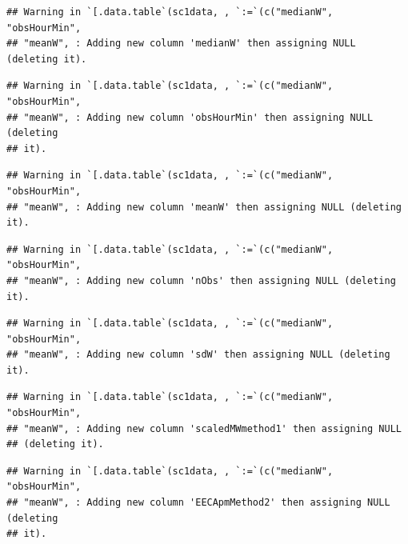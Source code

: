 \documentclass[]{article}
\theoremstyle{definition}
\theoremstyle{definition}
\theoremstyle{definition}
\theoremstyle{remark}
\begin{document}
\begin{verbatim}
## Warning in `[.data.table`(sc1data, , `:=`(c("medianW", "obsHourMin",
## "meanW", : Adding new column 'medianW' then assigning NULL (deleting it).
\end{verbatim}

\begin{verbatim}
## Warning in `[.data.table`(sc1data, , `:=`(c("medianW", "obsHourMin",
## "meanW", : Adding new column 'obsHourMin' then assigning NULL (deleting
## it).
\end{verbatim}

\begin{verbatim}
## Warning in `[.data.table`(sc1data, , `:=`(c("medianW", "obsHourMin",
## "meanW", : Adding new column 'meanW' then assigning NULL (deleting it).
\end{verbatim}

\begin{verbatim}
## Warning in `[.data.table`(sc1data, , `:=`(c("medianW", "obsHourMin",
## "meanW", : Adding new column 'nObs' then assigning NULL (deleting it).
\end{verbatim}

\begin{verbatim}
## Warning in `[.data.table`(sc1data, , `:=`(c("medianW", "obsHourMin",
## "meanW", : Adding new column 'sdW' then assigning NULL (deleting it).
\end{verbatim}

\begin{verbatim}
## Warning in `[.data.table`(sc1data, , `:=`(c("medianW", "obsHourMin",
## "meanW", : Adding new column 'scaledMWmethod1' then assigning NULL
## (deleting it).
\end{verbatim}

\begin{verbatim}
## Warning in `[.data.table`(sc1data, , `:=`(c("medianW", "obsHourMin",
## "meanW", : Adding new column 'EECApmMethod2' then assigning NULL (deleting
## it).
\end{verbatim}
\end{document}
